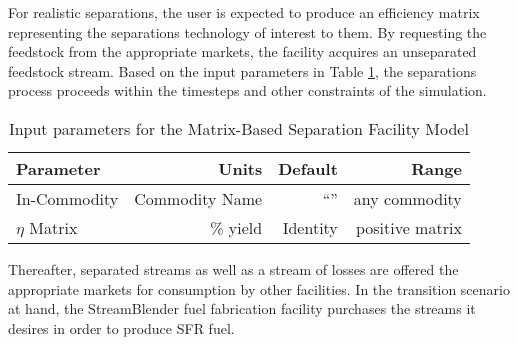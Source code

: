 For realistic separations, the user is expected to produce an efficiency 
matrix representing the separations technology of interest to them. 
By requesting the feedstock from the 
appropriate markets, the facility acquires an unseparated feedstock stream. 
Based on the input parameters  in Table \ref{tab:sepmatrix}, the separations 
process proceeds within the timesteps and other constraints of the simulation. 

\begin{table}[h!]
\centering
\begin{tabular}{|l|r|r|r|}
\hline
\textbf{Parameter} & \textbf{Units} & \textbf{Default} & \textbf{Range}\\ 
\hline
In-Commodity & Commodity Name &``'' &any commodity \\
$\eta$ Matrix & \% yield & Identity & positive matrix \\
\hline
\end{tabular}
\caption{Input parameters for the Matrix-Based Separation Facility Model}
\label{tab:sepmatrix}
\end{table}

Thereafter, separated streams as well as a stream of losses are offered the 
appropriate markets for consumption by other facilities. In the transition 
scenario at hand, the StreamBlender fuel fabrication facility purchases the 
streams it desires in order to produce SFR fuel. 
